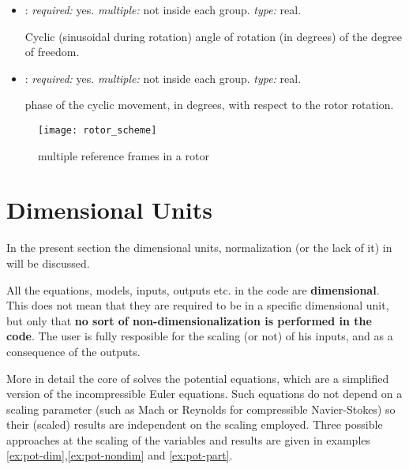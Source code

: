 \begin{itemize}
\begin{itemize}
    \item {}: \textit{required:} yes. \textit{multiple:} 
    not inside each  group. \textit{type:} real.
    
    Cyclic (sinusoidal during rotation) angle of rotation (in degrees) of 
    the degree of freedom.
    
    \item {}: \textit{required:} yes. \textit{multiple:} 
    not inside each  group. \textit{type:} real.
    
    phase of the cyclic movement, in degrees, with respect to the rotor rotation. 
    
    \end{itemize}
\end{itemize}

\begin{figure}
\centering
\texttt{[image: rotor\_scheme]}
\caption{multiple reference frames in a rotor}
\label{fig:multiple_refs}
\end{figure}

\section{Dimensional Units}
\label{sec:Dimensional_Units}

In the present section the dimensional units, normalization (or the lack of it) 
in \DUST{} will be discussed.

All the equations, models, inputs, outputs etc. in the code are \textbf{dimensional}. 
This does not mean that they are required to be in a specific dimensional unit, 
but only that \textbf{no sort of non-dimensionalization is performed in the code}. 
The user is fully resposible for the scaling (or not) of his inputs, and as a 
consequence of the outputs. 

More in detail the core of \DUST{} solves the potential equations, which are a 
simplified version of the incompressible Euler equations. Such equations do not 
depend on a scaling parameter (such as Mach or Reynolds for compressible Navier-Stokes) 
so their (scaled) results are independent on the scaling employed. Three possible 
approaches at the scaling of the variables and results are given in examples 
\ref{ex:pot-dim},\ref{ex:pot-nondim} and \ref{ex:pot-part}. 

